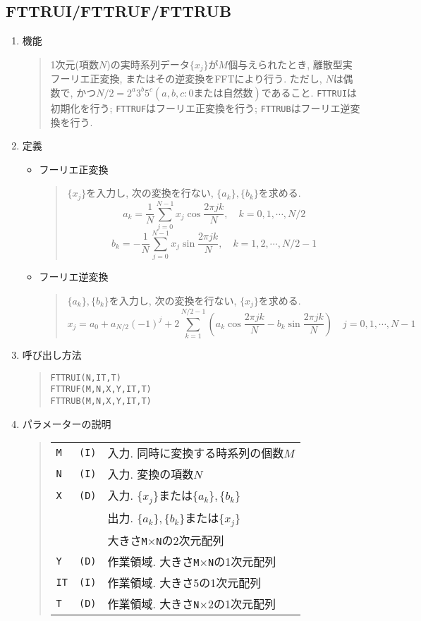 \documentclass[a4j]{jarticle}
\newcommand{\ttM}{{\tt M}}
\newcommand{\ttN}{{\tt N}}
\begin{document}
\subsection{FTTRUI/FTTRUF/FTTRUB}
\begin{enumerate}
  \item 機能 
  \begin{quote}
    1次元(項数$N$)の実時系列データ$\{x_j\}$が$M$個与えられたとき,
    離散型実フーリエ正変換, またはその逆変換をFFTにより行う. ただし, 
    $N$は偶数で, かつ$N/2=2^a3^b5^c(a,b,c: 0または自然数)$であること.
     {\tt FTTRUI}は初期化を行う;
     {\tt FTTRUF}はフーリエ正変換を行う;
     {\tt FTTRUB}はフーリエ逆変換を行う.

  \end{quote}
  \item 定義
    \begin{itemize}
     \item フーリエ正変換
      \begin{quote}
       $\{x_j\}$を入力し, 次の変換を行ない, $\{a_k\},\{b_k\}$を求める. 
       $$a_k= \frac1N\sum^{N-1}_{j=0}x_j\cos\frac{2\pi jk}N,
       \quad k=0,1,\cdots,N/2$$
       $$b_k=-\frac1N\sum^{N-1}_{j=0}x_j\sin\frac{2\pi jk}N,
       \quad k=1,2,\cdots,N/2-1$$
      \end{quote}
     \item フーリエ逆変換
      \begin{quote}
       $\{a_k\},\{b_k\}$を入力し, 次の変換を行ない, $\{x_j\}$を求める. 
       $$x_j=a_0+a_{N/2}(-1)^j+2\sum^{N/2-1}_{k=1}(a_k\cos\frac{2\pi jk}N
                          -b_k\sin\frac{2\pi jk}N)
       \quad j=0,1,\cdots,N-1$$
      \end{quote}
     \end{itemize}    
  \item 呼び出し方法 
  \begin{quote}
    {\tt FTTRUI(N,IT,T)}\\
    {\tt FTTRUF(M,N,X,Y,IT,T)}\\
    {\tt FTTRUB(M,N,X,Y,IT,T)}
  \end{quote}
  \item パラメーターの説明 
  \begin{quote}
    \begin{tabular}{llp{10cm}}
      {\tt M }&{\tt (I)}& 入力. 同時に変換する時系列の個数$M$\\
      {\tt N }&{\tt (I)}& 入力. 変換の項数$N$\\
      {\tt X }   & {\tt (D)} & 入力. $\{x_j\}$または$\{a_k\},\{b_k\}$\\
                 &           & 出力. $\{a_k\},\{b_k\}$または$\{x_j\}$\\
                 &           & 大きさ\ttM$\times$\ttN の2次元配列\\
      {\tt Y }   & {\tt (D)} & 作業領域. 大きさ\ttM$\times$\ttN の1次元配列\\
      {\tt IT}   & {\tt (I)} & 作業領域. 大きさ5の1次元配列\\
      {\tt T }   & {\tt (D)} & 作業領域. 大きさ\ttN$\times$2の1次元配列
    \end{tabular}
  \end{quote}


\end{enumerate}
\end{document}
